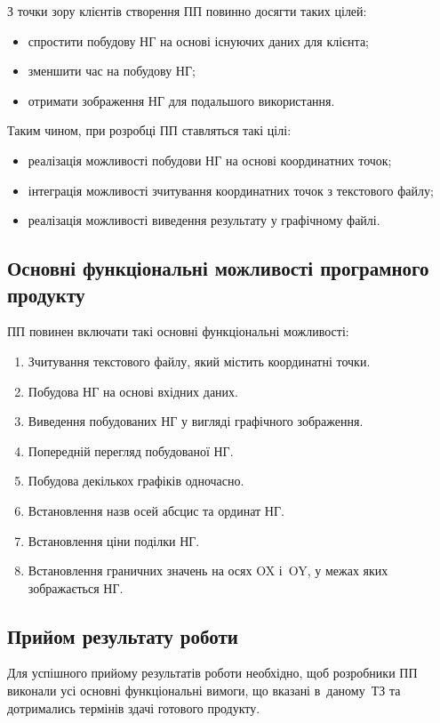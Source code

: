 \documentclass[a4paper,oneside,DIV=12,12pt]{scrartcl}
\begin{document}
			З точки зору клієнтів створення ПП повинно досягти таких цілей:
			\begin{itemize}
				\item спростити побудову НГ на основі існуючих даних для клієнта;
				\item зменшити час на побудову НГ;
				\item отримати зображення НГ для подальшого використання.
			\end{itemize}

			Таким чином, при розробці ПП ставляться такі цілі:
			\begin{itemize}
				\item реалізація можливості побудови НГ на основі координатних точок;
				\item інтеграція можливості зчитування координатних точок з текстового файлу;
				\item реалізація можливості виведення результату у графічному файлі.
			\end{itemize}

		\subsection{Основні функціональні можливості програмного продукту}

			ПП повинен включати такі основні функціональні можливості:
			\begin{enumerate}
				\item Зчитування текстового файлу, який містить координатні точки.
				\item Побудова НГ на основі вхідних даних.
				\item Виведення побудованих НГ у вигляді графічного зображення.
				\item Попередній перегляд побудованої НГ.
				\item Побудова декількох графіків одночасно.
				\item Встановлення назв осей абсцис та ординат НГ.
				\item Встановлення ціни поділки НГ.
				\item Встановлення граничних значень на осях OX і~OY, у межах яких зображається НГ.
			\end{enumerate}
			
		\subsection{Прийом результату роботи}
			Для успішного прийому результатів роботи необхідно, щоб розробники ПП виконали усі основні функціональні вимоги, що вказані в~даному~ТЗ та дотримались термінів здачі готового продукту.
			
\end{document}
